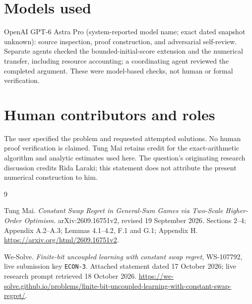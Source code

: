 \documentclass[11pt]{article}
\begin{document}
\section*{Models used}
OpenAI GPT-6 Astra Pro (system-reported model name; exact dated snapshot
unknown): source inspection, proof construction, and adversarial
self-review.  Separate agents checked the bounded-initial-score
extension and the numerical transfer, including resource accounting;
a coordinating agent reviewed the completed argument.  These were
model-based checks, not human or formal verification.

\section*{Human contributors and roles}
The user specified the problem and requested attempted solutions.
No human proof verification is claimed.  Tung Mai retains credit for
the exact-arithmetic algorithm and analytic estimates used here.
The question's originating research discussion credits Rida Laraki;
this statement does not attribute the present numerical construction
to him.

\begin{thebibliography}{9}
\raggedright
{}
Tung Mai.
\emph{Constant Swap Regret in General-Sum Games via Two-Scale Higher-Order
Optimism}.  arXiv:2609.16751v2, revised 19 September 2026.
Sections 2--4; Appendix A.2--A.3; Lemmas 4.1--4.2, F.1 and G.1;
Appendix H.
\url{https://arxiv.org/html/2609.16751v2}.

We-Solve.
\emph{Finite-bit uncoupled learning with constant swap regret},
WS-107792, live submission key \texttt{ECON-3}.
Attached statement dated 17 October 2026; live research prompt
retrieved 18 October 2026.
\url{https://we-solve.github.io/problems/finite-bit-uncoupled-learning-with-constant-swap-regret/}.
\end{thebibliography}
\end{document}
